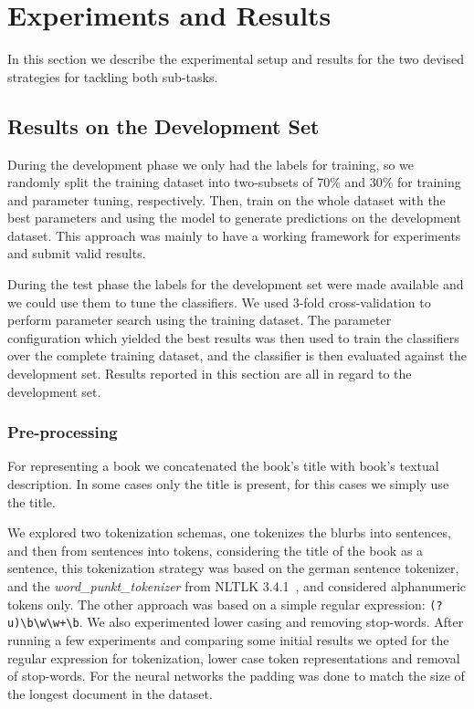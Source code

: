 \documentclass[11pt,a4paper]{article}
\begin{document}
\section{Experiments and Results}\label{section_experiments}

In this section we describe the experimental setup and results for the two
devised strategies for tackling both sub-tasks.

\subsection{Results on the Development Set}\label{experiments}

During the development phase we only had the labels for training, so we
randomly split the training dataset into two-subsets of 70\% and 30\% for
training and parameter tuning, respectively. Then, train on the whole
dataset with the best parameters and using the model to generate predictions on
the development dataset. This approach was mainly to have a working framework
for experiments and submit valid results.

During the test phase the labels for the development set were made available
and we could use them to tune the classifiers. We used 3-fold cross-validation
to perform parameter search using the training dataset. The parameter
configuration which yielded the best results was then used to train
the classifiers over the complete training dataset, and the classifier is then
evaluated against the development set. Results reported in this section
are all in regard to the development set.

\subsubsection{Pre-processing}

For representing a book we concatenated the book's title with book's textual
description. In some cases only the title is present, for this cases we simply
use the title.

We explored two tokenization schemas, one tokenizes the blurbs into
sentences, and then from sentences into tokens, considering the title of the
book as a sentence, this tokenization strategy was based on the german sentence
tokenizer, and the \textit{word\_punkt\_tokenizer} from NLTLK 3.4.1~\cite{Bird:2009:NLP:1717171},
and considered alphanumeric tokens only. The other approach was based on a
simple regular expression: \verb|(?u)\b\w\w+\b|. We also experimented lower casing
and removing stop-words. After running a few experiments and comparing some
initial results we opted for the regular expression for tokenization, lower case
token representations and removal of stop-words. For the neural networks the
padding was done to match the size of the longest document in the dataset.
\end{document}
